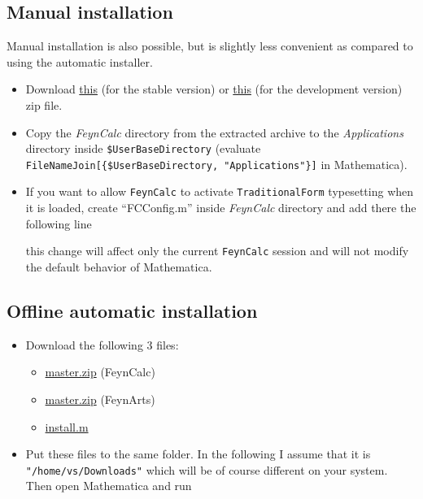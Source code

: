 \documentclass[../FeynCalcManual.tex]{subfiles}
\begin{document}
\hypertarget{manual-installation}{%
\subsection{Manual installation}\label{manual-installation}}

Manual installation is also possible, but is slightly less convenient as
compared to using the automatic installer.

\begin{itemize}
\item
  Download
  \href{https://github.com/FeynCalc/feyncalc/archive/hotfix-stable.zip}{this}
  (for the stable version) or
  \href{https://github.com/FeynCalc/feyncalc/archive/master.zip}{this}
  (for the development version) zip file.
\item
  Copy the \emph{FeynCalc} directory from the extracted archive to the
  \emph{Applications} directory inside \texttt{\$UserBaseDirectory}
  (evaluate
  \texttt{FileNameJoin[\allowbreak{}\{\allowbreak{}\$UserBaseDirectory,\ \allowbreak{}"Applications"\}]}
  in Mathematica).
\item
  If you want to allow \texttt{FeynCalc} to activate
  \texttt{TraditionalForm} typesetting when it is loaded, create
  ``FCConfig.m'' inside \emph{FeynCalc} directory and add there the
  following line

\begin{Shaded}
\begin{Highlighting}[]
\ExtensionTok{=}\NormalTok{;}
\end{Highlighting}
\end{Shaded}

  this change will affect only the current \texttt{FeynCalc} session and
  will not modify the default behavior of Mathematica.
\end{itemize}

\hypertarget{offline-automatic-installation}{%
\subsection{Offline automatic
installation}\label{offline-automatic-installation}}

\begin{itemize}
\item
  Download the following 3 files:

  \begin{itemize}
  \tightlist
  \item
    \href{https://github.com/FeynCalc/feyncalc/archive/master.zip}{master.zip}
    (FeynCalc)
  \item
    \href{https://github.com/FeynCalc/feynarts-mirror/archive/master.zip}{master.zip}
    (FeynArts)
  \item
    \href{https://github.com/FeynCalc/feyncalc/raw/master/install.m}{install.m}
  \end{itemize}
\item
  Put these files to the same folder. In the following I assume that it
  is \texttt{"/home/vs/Downloads"} which will be of course different on
  your system. Then open Mathematica and run
\end{itemize}
\end{document}
